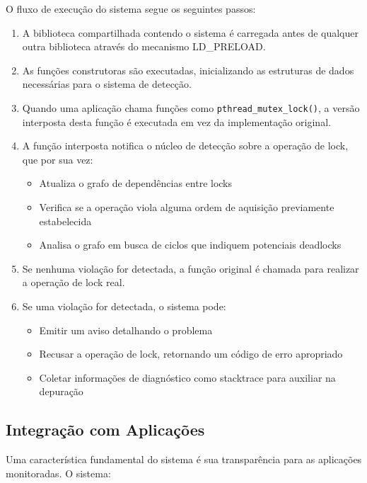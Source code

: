 O fluxo de execução do sistema segue os seguintes passos:

\begin{enumerate}
    \item A biblioteca compartilhada contendo o sistema é carregada antes de qualquer outra biblioteca através do mecanismo LD\_PRELOAD.

    \item As funções construtoras são executadas, inicializando as estruturas de dados necessárias para o sistema de detecção.

    \item Quando uma aplicação chama funções como \texttt{pthread\_mutex\_lock()}, a versão interposta desta função é executada em vez da implementação original.

    \item A função interposta notifica o núcleo de detecção sobre a operação de lock, que por sua vez:
    \begin{itemize}
        \item Atualiza o grafo de dependências entre locks
        \item Verifica se a operação viola alguma ordem de aquisição previamente estabelecida
        \item Analisa o grafo em busca de ciclos que indiquem potenciais deadlocks
    \end{itemize}

    \item Se nenhuma violação for detectada, a função original é chamada para realizar a operação de lock real.

    \item Se uma violação for detectada, o sistema pode:
    \begin{itemize}
        \item Emitir um aviso detalhando o problema
        \item Recusar a operação de lock, retornando um código de erro apropriado
        \item Coletar informações de diagnóstico como stacktrace para auxiliar na depuração
    \end{itemize}
\end{enumerate}

\subsection{Integração com Aplicações}

Uma característica fundamental do sistema é sua transparência para as aplicações monitoradas. O sistema:

